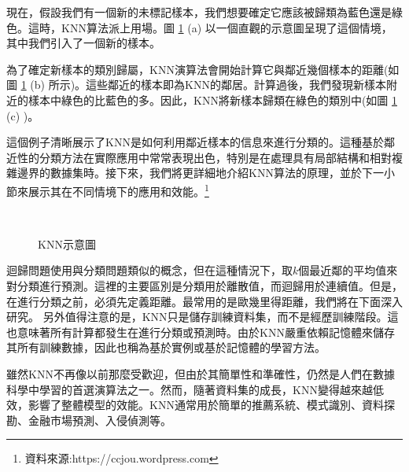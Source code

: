 \documentclass[12pt, a4paper]{article}
\begin{document}
現在，假設我們有一個新的未標記樣本，我們想要確定它應該被歸類為藍色還是綠色。這時，KNN算法派上用場。圖 \ref{fig:knn示意圖} (a) 以一個直觀的示意圖呈現了這個情境，其中我們引入了一個新的樣本。

為了確定新樣本的類別歸屬，KNN演算法會開始計算它與鄰近幾個樣本的距離(如圖 \ref{fig:knn示意圖} (b) 所示)。這些鄰近的樣本即為KNN的鄰居。計算過後，我們發現新樣本附近的樣本中綠色的比藍色的多。因此，KNN將新樣本歸類在綠色的類別中(如圖 \ref{fig:knn示意圖} (c) )。

這個例子清晰展示了KNN是如何利用鄰近樣本的信息來進行分類的。這種基於鄰近性的分類方法在實際應用中常常表現出色，特別是在處理具有局部結構和相對複雜邊界的數據集時。接下來，我們將更詳細地介紹KNN算法的原理，並於下一小節來展示其在不同情境下的應用和效能。\footnote{資料來源:https://ccjou.wordpress.com}
\\
\begin{figure}[H]
    \centering
        \\
    \caption{KNN示意圖}
    \label{fig:knn示意圖}
\end{figure}

迴歸問題使用與分類問題類似的概念，但在這種情況下，取$k$個最近鄰的平均值來對分類進行預測。這裡的主要區別是分類用於離散值，而迴歸用於連續值。但是，在進行分類之前，必須先定義距離。最常用的是歐幾里得距離，我們將在下面深入研究。
另外值得注意的是，KNN只是儲存訓練資料集，而不是經歷訓練階段。這也意味著所有計算都發生在進行分類或預測時。由於KNN嚴重依賴記憶體來儲存其所有訓練數據，因此也稱為基於實例或基於記憶體的學習方法。

雖然KNN不再像以前那麼受歡迎，但由於其簡單性和準確性，仍然是人們在數據科學中學習的首選演算法之一。然而，隨著資料集的成長，KNN變得越來越低效，影響了整體模型的效能。KNN通常用於簡單的推薦系統、模式識別、資料探勘、金融市場預測、入侵偵測等。 
\end{document}

